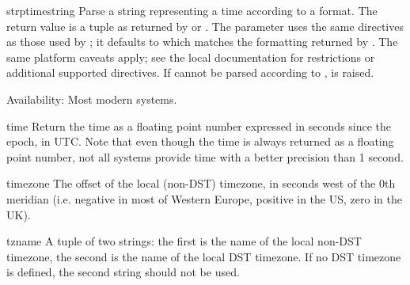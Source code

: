 \begin{funcdesc}{strptime}{string}
Parse a string representing a time according to a format.  The return 
value is a tuple as returned by  or
.  The  parameter uses the same
directives as those used by ; it defaults to
 which matches the formatting
returned by .  The same platform caveats apply; see
the local \UNIX{} documentation for restrictions or additional
supported directives.  If  cannot be parsed according to
,  is raised.

Availability: Most modern \UNIX{} systems.
\end{funcdesc}

\begin{funcdesc}{time}{}
Return the time as a floating point number expressed in seconds since
the epoch, in UTC.  Note that even though the time is always returned
as a floating point number, not all systems provide time with a better
precision than 1 second.
\end{funcdesc}

\begin{datadesc}{timezone}
The offset of the local (non-DST) timezone, in seconds west of the 0th
meridian (i.e. negative in most of Western Europe, positive in the US,
zero in the UK).
\end{datadesc}

\begin{datadesc}{tzname}
A tuple of two strings: the first is the name of the local non-DST
timezone, the second is the name of the local DST timezone.  If no DST
timezone is defined, the second string should not be used.
\end{datadesc}


\begin{seealso}
\end{seealso}
